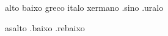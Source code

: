 % 
%

\begin{prefixos}
alto baixo
greco italo xermano .sino .uralo
\end{prefixos}

\begin{3a_ppi}
asalto .baixo .rebaixo
\end{3a_ppi}
\endinput